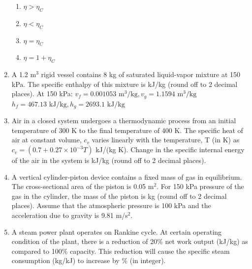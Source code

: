 \documentclass[a4paper,10pt]{article}
\begin{document}
\begin{enumerate}
\hfill{}
\begin{enumerate}
    \item $\eta > \eta_C$
    \item $\eta < \eta_C$
    \item $\eta = \eta_C$
    \item $\eta = 1 + \eta_C$
\end{enumerate}

\item A 1.2 m$^3$ rigid vessel contains 8 kg of saturated liquid-vapor mixture at 150 kPa. The specific enthalpy of this mixture is \underline{\hspace{2cm}} kJ/kg (round off to 2 decimal places).
At 150 kPa: $v_f = 0.001053 \text{ m}^3/\text{kg}, v_g = 1.1594 \text{ m}^3/\text{kg}$
$h_f = 467.13 \text{ kJ/kg}, h_g = 2693.1 \text{ kJ/kg}$

\hfill{}

\item Air in a closed system undergoes a thermodynamic process from an initial temperature of 300 K to the final temperature of 400 K. The specific heat of air at constant volume, $c_v$ varies linearly with the temperature, T (in K) as
$c_v = (0.7 + 0.27 \times 10^{-3} T)$ kJ/(kg K).
Change in the specific internal energy of the air in the system is \underline{\hspace{2cm}} kJ/kg (round off to 2 decimal places).

\hfill{}

\item A vertical cylinder-piston device contains a fixed mass of gas in equilibrium. The cross-sectional area of the piston is 0.05 m$^2$. For 150 kPa pressure of the gas in the cylinder, the mass of the piston is \underline{\hspace{2cm}} kg (round off to 2 decimal places).
Assume that the atmospheric pressure is 100 kPa and the acceleration due to gravity is 9.81 m/s$^2$.

\hfill{}

\item A steam power plant operates on Rankine cycle. At certain operating condition of the plant, there is a reduction of 20\% net work output (kJ/kg) as compared to 100\% capacity. This reduction will cause the specific steam consumption (kg/kJ) to increase by \underline{\hspace{2cm}} \% (in integer).


\end{enumerate}
\end{document}
